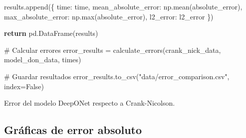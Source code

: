 \documentclass[
  spanish,
  us-letterpaper,
  DIV=11,
  numbers=noendperiod]{scrreprt}
\newenvironment{Shaded}{\begin{snugshade}}{\end{snugshade}}
\newcommand{\BuiltInTok}[1]{\textcolor[rgb]{0.00,0.23,0.31}{#1}}
\newcommand{\CommentTok}[1]{\textcolor[rgb]{0.37,0.37,0.37}{#1}}
\newcommand{\ControlFlowTok}[1]{\textcolor[rgb]{0.00,0.23,0.31}{\textbf{#1}}}
\newcommand{\NormalTok}[1]{\textcolor[rgb]{0.00,0.23,0.31}{#1}}
\newcommand{\OperatorTok}[1]{\textcolor[rgb]{0.37,0.37,0.37}{#1}}
\newcommand{\StringTok}[1]{\textcolor[rgb]{0.13,0.47,0.30}{#1}}
\newcommand{\VariableTok}[1]{\textcolor[rgb]{0.07,0.07,0.07}{#1}}
\theoremstyle{plain}
\theoremstyle{definition}
\theoremstyle{remark}
\begin{document}
\begin{Shaded}
\begin{Highlighting}[]
\NormalTok{        results.append(\{}
            \StringTok{\textquotesingle{}time\textquotesingle{}}\NormalTok{: time,}
            \StringTok{\textquotesingle{}mean\_absolute\_error\textquotesingle{}}\NormalTok{: np.mean(absolute\_error),}
            \StringTok{\textquotesingle{}max\_absolute\_error\textquotesingle{}}\NormalTok{: np.}\BuiltInTok{max}\NormalTok{(absolute\_error),}
            \StringTok{\textquotesingle{}l2\_error\textquotesingle{}}\NormalTok{: l2\_error}
\NormalTok{        \})}
    
    \ControlFlowTok{return}\NormalTok{ pd.DataFrame(results)}

\CommentTok{\# Calcular errores}
\NormalTok{error\_results }\OperatorTok{=}\NormalTok{ calculate\_errors(crank\_nick\_data, model\_don\_data, times)}

\CommentTok{\# Guardar resultados}
\NormalTok{error\_results.to\_csv(}\StringTok{"data/error\_comparison.csv"}\NormalTok{, index}\OperatorTok{=}\VariableTok{False}\NormalTok{)}
\end{Highlighting}
\end{Shaded}

\begin{table}

\caption{\label{tbl-errores}Error del modelo DeepONet respecto a
Crank-Nicolson.}


\end{table}%

\subsection{Gráficas de error
absoluto}\label{gruxe1ficas-de-error-absoluto}
\end{document}
